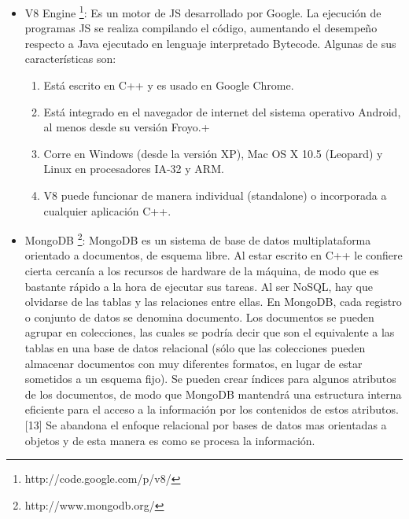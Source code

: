 \begin{itemize}
 \item V8 Engine \footnote{http://code.google.com/p/v8/}: Es un motor de JS desarrollado por Google. La 
 ejecución de programas JS se realiza compilando el código, aumentando el desempeño respecto a Java ejecutado en lenguaje 
 interpretado Bytecode.
 Algunas de sus características son:
 \begin{enumerate}
  \item Está escrito en C++ y es usado en Google Chrome.
  \item Está integrado en el navegador de internet del sistema operativo Android, al menos desde su versión Froyo.+
  \item Corre en Windows (desde la versión XP), Mac OS X 10.5 (Leopard) y Linux en procesadores IA-32 y ARM.
  \item V8 puede funcionar de manera individual (standalone) o incorporada a cualquier aplicación C++.
 \end{enumerate}

 \item MongoDB \footnote{http://www.mongodb.org/}: MongoDB es un sistema de base de datos multiplataforma orientado a documentos, 
 de esquema libre. Al estar escrito en C++ le confiere cierta cercanía a los recursos de hardware de la máquina, de 
 modo que es bastante rápido a la hora de ejecutar sus tareas. 
 Al ser NoSQL, hay que olvidarse de las tablas y las relaciones entre ellas.
 En MongoDB, cada registro o conjunto de datos se denomina documento. Los documentos se pueden agrupar en colecciones, las cuales se 
 podría decir que son el equivalente a las tablas en una base de datos relacional (sólo que las colecciones pueden almacenar 
 documentos con muy diferentes formatos, en lugar de estar sometidos a un esquema fijo). Se pueden crear índices para algunos 
 atributos de los documentos, de modo que MongoDB mantendrá una estructura interna eficiente para el acceso a la información por 
 los contenidos de estos atributos. [13] 
 Se abandona el enfoque relacional por bases de datos mas orientadas a objetos y de esta manera es como se procesa la información.
 

\end{itemize}
